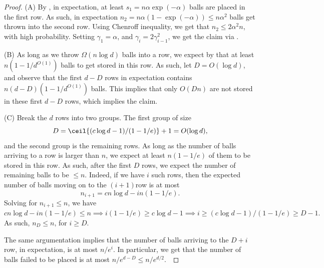\begin{proof}
    (A) By , in expectation, at least
    $s_1 = n\alpha \exp(-\alpha)$ balls are placed in the first
    row. As such, in expectation
    $n_2 = n \alpha (1 - \exp( -\alpha)) \leq n\alpha^2$ balls get
    thrown into the second row. Using Chenroff inequality, we get that
    $n_2 \leq 2 \alpha^{2}n$, with high probability. Setting
    $\gamma_1 = \alpha$, and $\gamma_i = 2 \gamma_{i-1}^2$, we get the
    claim via 
    .

    
    (B) As long as we throw $\Omega( n \log d)$ balls into a row, we
    expect by  that at least $n(1-1/d^{O(1)})$
    balls to get stored in this row. As such, let $D = O(\log d )$,
    and observe that the first $d-D$ rows in expectation contains
    $n(d-D)(1-1/d^{O(1)})$ balls. This implies that only $O(D n)$ are
    not stored in these first $d-D$ rows, which implies the claim.


    (C) Break the $d$ rows into two groups. The first group of size
    \begin{equation*}
        D= \ceil{(c \log d-1)/(1-1/e)} + 1 = O(\log d),
    \end{equation*}
    and the second group is the remaining rows. As long as the number
    of balls arriving to a row is larger than $n$, we expect at least
    $n(1-1/e)$ of them to be stored in this row. As such, after the
    first $D$ rows, we expect the number of remaining balls to be
    $\leq n$. Indeed, if we have $i$ such rows, then the expected
    number of balls moving on to the $(i+1)$\th row is at most
    \begin{equation*}
        n_{i+1} = cn \log d - i n(1-1/e).
    \end{equation*}
    Solving for $n_{i+1} \leq n$, we have
    \begin{math}
        cn \log d - i n(1-1/e) \leq n \implies i (1-1/e) \geq c \log
        d-1 \implies i \geq (c \log d-1)/(1-1/e) \geq D - 1.
    \end{math}    
    As such, $n_D \leq n$, for $i \geq D$.
    
    The same argumentation implies that the number of balls arriving
    to the $D+i$ row, in expectation, is at most $n/e^i$. In
    particular, we get that the number of balls failed to be placed is
    at most $n/e^{d-D} \leq n/e^{d/2}$.~
\end{proof}


